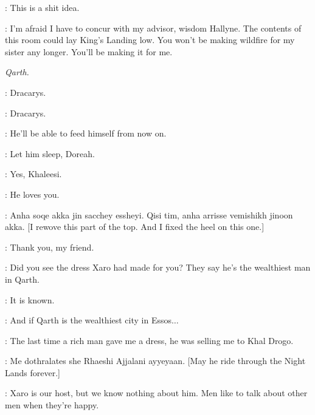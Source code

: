 \BRONN: This is a shit idea. 

\TYRION: I'm afraid I have to concur with my advisor, wisdom Hallyne. The contents of this room could lay King's Landing low. You won't be making wildfire for my sister any longer. You'll be making it for me. 


\scene

\textit{Qarth.} 


\DAENERYS: Dracarys. 


\DAENERYS: Dracarys. 


\DAENERYS: He'll be able to feed himself from now on. 


\DAENERYS: Let him sleep, Doreah. 

\DOREAH: Yes, Khaleesi. 

\DAENERYS: He loves you. 


\IRRI:  Anha soqe akka jin sacchey essheyi. Qisi tim, anha arrisse vemishikh jinoon akka. [I rewove this part of the top. And I fixed the heel on this one.] 

\DAENERYS: Thank you, my friend. 


\DOREAH: Did you see the dress Xaro had made for you? They say he's the wealthiest man in Qarth. 

\IRRI: It is known. 

\DOREAH: And if Qarth is the wealthiest city in Essos$\ldots$  

\DAENERYS: The last time a rich man gave me a dress, he was selling me to Khal Drogo. 

\IRRI: Me dothralates she Rhaeshi Ajjalani ayyeyaan. [May he ride through the Night Lands forever.] 

\DAENERYS: Xaro is our host, but we know nothing about him. Men like to talk about other men when they're happy. 


